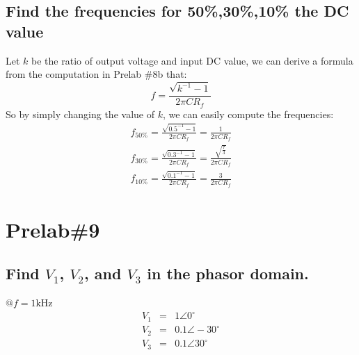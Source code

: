 \documentclass{IEEEtran}
\begin{document}
	\subsection{Find the frequencies for 50\%,30\%,10\% the DC value}
	Let $k$ be the ratio of output voltage and input DC value, we can derive a formula from the computation in Prelab \#8b that:\\
	\begin{equation*}
		f = \frac{\sqrt{k^{-1}-1}}{2\pi CR_f}
	\end{equation*}
	So by simply changing the value of $k$, we can easily compute the frequencies:\\
	\begin{eqnarray*}
		f_{50\%} = \frac{\sqrt{0.5^{-1}-1}}{2\pi CR_f} = \frac{1}{2\pi CR_f}\\
		f_{30\%} = \frac{\sqrt{0.3^{-1}-1}}{2\pi CR_f} = \frac{\sqrt{\frac{7}{3}}}{2\pi CR_f}\\
		f_{10\%} = \frac{\sqrt{0.1^{-1}-1}}{2\pi CR_f} = \frac{3}{2\pi CR_f}
	\end{eqnarray*} 
	\section{\textbf{Prelab\#9}}
	\subsection{Find $V_1$, $V_2$, and $V_3$ in the phasor domain.}
	$\mathbf{@} f = 1\mathrm{kHz}$
	\begin{eqnarray*}
		V_1 & = & 1\angle 0^{\circ}\\
		V_2 & = & 0.1\angle -30^{\circ}\\
		V_3 & = & 0.1\angle 30^{\circ}
	\end{eqnarray*}
\end{document}
